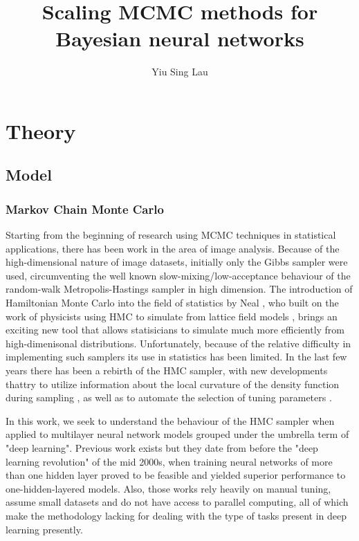 \documentclass{book}
\title{Scaling MCMC methods for Bayesian neural networks}
\author{Yiu Sing Lau}
\date{}
\begin{document}
\maketitle
\tableofcontents 
\part{Theory}
 
\chapter{Model}

\section{Markov Chain Monte Carlo}

Starting from the beginning of research using MCMC techniques in statistical applications, there has been work \cite{geman1984stochastic,besag1986statistical} in the area of image analysis. Because of the high-dimensional nature of image datasets, initially only the Gibbs sampler were used, circumventing the well known slow-mixing/low-acceptance behaviour of the random-walk Metropolis-Hastings sampler in high dimension. The introduction of Hamiltonian Monte Carlo into the field of statistics by Neal \cite{neal2011mcmc,neal2012bayesian}, who built on the work of physicists using HMC to simulate from lattice field models \cite{duane1987hybrid}, brings an exciting new tool that allows statisicians to simulate much more efficiently from high-dimenisonal distributions. Unfortunately, because of the relative difficulty in implementing such samplers its use in statistics has been limited. In the last few years there has been a rebirth of the HMC sampler, with new developments thattry to utilize information about the local curvature of the density function during  sampling \cite{girolami2011riemann,betancourt2013general}, as well as to automate the selection of tuning parameters \cite{hoffman2014no,betancourt2016identifying}. 

In this work, we seek to understand the behaviour of the HMC sampler when
applied to multilayer neural network models grouped under the umbrella term of
"deep learning"\cite{schmidhuber2015deep}. Previous work exists
\cite{choo2000learning,neal2012bayesian} but they date from before the "deep
learning revolution" of the mid 2000s, when training neural networks of more
than one hidden layer proved to be feasible and yielded superior performance to
one-hidden-layered models. Also, those works rely heavily on manual tuning,
assume small datasets and do not have access to parallel computing, all of which
make the methodology lacking for dealing with the type of tasks present in deep
learning presently.
\end{document}
